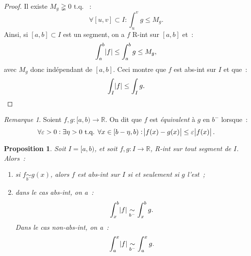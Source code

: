 \documentclass{report}
\newtheorem{prp}[thm]{Proposition}
\theoremstyle{definition}
\theoremstyle{remark}
\newtheorem*{rmq}{Remarque}
\numberwithin{equation}{section}
\newcommand{\R}{\mathbb R}
\newcommand{\tq}{\text{ t.q. }}
\begin{document}
			\begin{proof} Il existe $M_g \gneqq 0 \tq$~:
			\begin{equation}
				\forall [u, v] \subset I : \int_u^vg \leq M_g.
			\end{equation}
			Ainsi, si $[a, b] \subset I$ est un segment, on a $f$ R-int sur $[a, b]$ et~:
			\begin{equation}
				\int_a^b\abs f \leq \int_a^b g \leq M_g,
			\end{equation}
			avec $M_g$ donc indépendant de $[a, b]$. Ceci montre que $f$ est abs-int sur $I$ et que~:
			\begin{equation}
				\int_I \abs f \leq \int_I g.
			\end{equation}
			\end{proof}

			\begin{rmq} Soient $f, g : [a, b) \to \R$. On dit que $f$ est \textit{équivalent} à $g$ en $b^-$ lorsque~:
			\begin{equation}
				\forall \varepsilon > 0 : \exists \eta > 0 \tq \forall x \in [b-\eta, b) : \abs {f(x)-g(x)} \leq \varepsilon \abs {f(x)}.
			\end{equation}
			\end{rmq}

			\begin{prp} Soit $I = [a, b)$, et soit $f, g : I \to \R$, R-int sur tout segment de $I$. Alors~:
			\begin{enumerate}
				\item si $f \underset {b^-}\sim g(x)$, alors $f$ est abs-int sur $I$ si et seulement si $g$ l'est~;
				\item dans le cas abs-int, on a~:
				\begin{equation}
					\int_x^b\abs f \underset {b^-}\sim \int_x^b g.
				\end{equation}
				Dans le cas non-abs-int, on a~:
				\begin{equation}
					\int_a^x\abs f \underset {b^-}\sim \int_a^x g.
				\end{equation}
			\end{enumerate}
			\end{prp}
\end{document}
